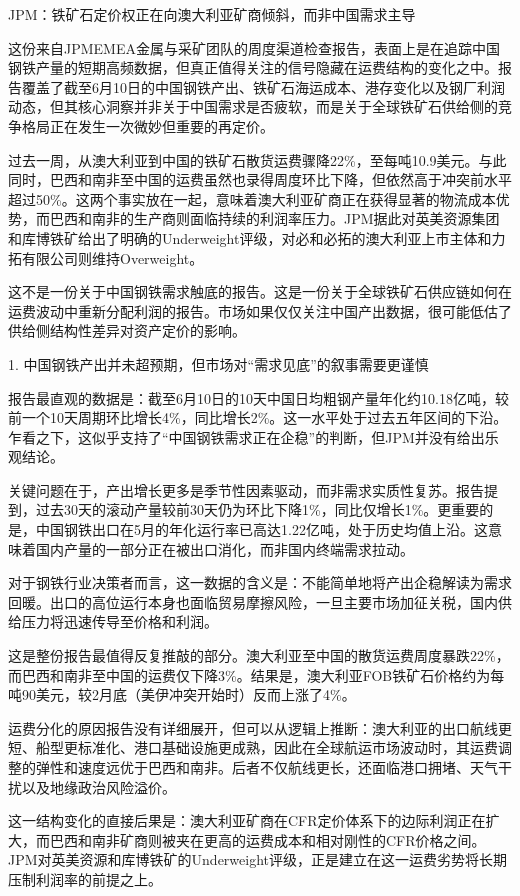 \documentclass[11pt]{ctexart}
\begin{document}
JPM：铁矿石定价权正在向澳大利亚矿商倾斜，而非中国需求主导

这份来自JPMEMEA金属与采矿团队的周度渠道检查报告，表面上是在追踪中国钢铁产量的短期高频数据，但真正值得关注的信号隐藏在运费结构的变化之中。报告覆盖了截至6月10日的中国钢铁产出、铁矿石海运成本、港存变化以及钢厂利润动态，但其核心洞察并非关于中国需求是否疲软，而是关于全球铁矿石供给侧的竞争格局正在发生一次微妙但重要的再定价。

过去一周，从澳大利亚到中国的铁矿石散货运费骤降22\%，至每吨10.9美元。与此同时，巴西和南非至中国的运费虽然也录得周度环比下降，但依然高于冲突前水平超过50\%。这两个事实放在一起，意味着澳大利亚矿商正在获得显著的物流成本优势，而巴西和南非的生产商则面临持续的利润率压力。JPM据此对英美资源集团和库博铁矿给出了明确的Underweight评级，对必和必拓的澳大利亚上市主体和力拓有限公司则维持Overweight。

这不是一份关于中国钢铁需求触底的报告。这是一份关于全球铁矿石供应链如何在运费波动中重新分配利润的报告。市场如果仅仅关注中国产出数据，很可能低估了供给侧结构性差异对资产定价的影响。

1. 中国钢铁产出并未超预期，但市场对“需求见底”的叙事需要更谨慎

报告最直观的数据是：截至6月10日的10天中国日均粗钢产量年化约10.18亿吨，较前一个10天周期环比增长4\%，同比增长2\%。这一水平处于过去五年区间的下沿。乍看之下，这似乎支持了“中国钢铁需求正在企稳”的判断，但JPM并没有给出乐观结论。

关键问题在于，产出增长更多是季节性因素驱动，而非需求实质性复苏。报告提到，过去30天的滚动产量较前30天仍为环比下降1\%，同比仅增长1\%。更重要的是，中国钢铁出口在5月的年化运行率已高达1.22亿吨，处于历史均值上沿。这意味着国内产量的一部分正在被出口消化，而非国内终端需求拉动。

对于钢铁行业决策者而言，这一数据的含义是：不能简单地将产出企稳解读为需求回暖。出口的高位运行本身也面临贸易摩擦风险，一旦主要市场加征关税，国内供给压力将迅速传导至价格和利润。

这是整份报告最值得反复推敲的部分。澳大利亚至中国的散货运费周度暴跌22\%，而巴西和南非至中国的运费仅下降3\%。结果是，澳大利亚FOB铁矿石价格约为每吨90美元，较2月底（美伊冲突开始时）反而上涨了4\%。

运费分化的原因报告没有详细展开，但可以从逻辑上推断：澳大利亚的出口航线更短、船型更标准化、港口基础设施更成熟，因此在全球航运市场波动时，其运费调整的弹性和速度远优于巴西和南非。后者不仅航线更长，还面临港口拥堵、天气干扰以及地缘政治风险溢价。

这一结构变化的直接后果是：澳大利亚矿商在CFR定价体系下的边际利润正在扩大，而巴西和南非矿商则被夹在更高的运费成本和相对刚性的CFR价格之间。JPM对英美资源和库博铁矿的Underweight评级，正是建立在这一运费劣势将长期压制利润率的前提之上。
\end{document}
